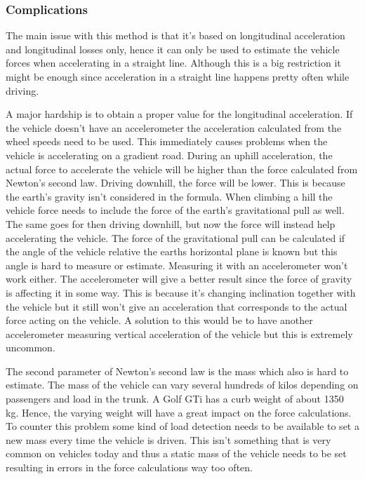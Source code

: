 \subsubsection{Complications}
The main issue with this method is that it's based on longitudinal acceleration and longitudinal losses only, hence it can only be used to estimate the vehicle forces when accelerating in a straight line. Although this is a big restriction it might be enough since acceleration in a straight line happens pretty often while driving.

A major hardship is to obtain a proper value for the longitudinal acceleration. If the vehicle doesn't have an accelerometer the acceleration calculated from the wheel speeds need to be used. This immediately causes problems when the vehicle is accelerating on a gradient road. During an uphill acceleration, the actual force to accelerate the vehicle will be higher than the force calculated from Newton's second law. Driving downhill, the force will be lower. This is because the earth's gravity isn't considered in the formula. When climbing a hill the vehicle force needs to include the force of the earth's gravitational pull as well. The same goes for then driving downhill, but now the force will instead help accelerating the vehicle. The force of the gravitational pull can be calculated if the angle of the vehicle relative the earths horizontal plane is known but this angle is hard to measure or estimate. Measuring it with an accelerometer won't work either. The accelerometer will give a better result since the force of gravity is affecting it in some way. This is because it's changing inclination together with the vehicle but it still won't give an acceleration that corresponds to the actual force acting on the vehicle. A solution to this would be to have another accelerometer measuring vertical acceleration of the vehicle but this is extremely uncommon.

The second parameter of Newton's second law is the mass which also is hard to estimate. The mass of the vehicle can vary several hundreds of kilos depending on passengers and load in the trunk. A Golf GTi has a curb weight of about 1350 kg. Hence, the varying weight will have a great impact on the force calculations. To counter this problem some kind of load detection needs to be available to set a new mass every time the vehicle is driven. This isn't something that is very common on vehicles today and thus a static mass of the vehicle needs to be set resulting in errors in the force calculations way too often.

